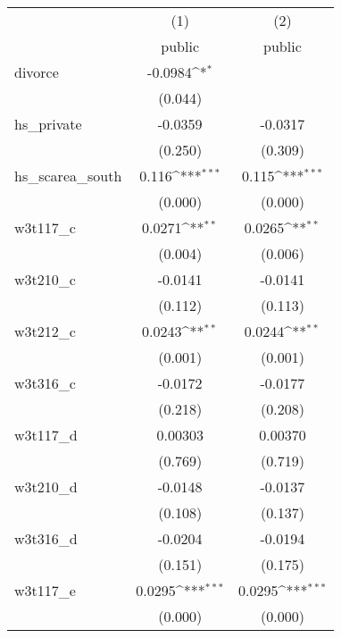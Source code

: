 {
\def\sym#1{\ifmmode^{#1}\else\(^{#1}\)\fi}
\begin{tabular}{l*{2}{c}}
\hline\hline
            &\multicolumn{1}{c}{(1)}&\multicolumn{1}{c}{(2)}\\
            &\multicolumn{1}{c}{public}&\multicolumn{1}{c}{public}\\
\hline
divorce     &     -0.0984\sym{*}  &                     \\
            &     (0.044)         &                     \\
[1em]
hs\_private  &     -0.0359         &     -0.0317         \\
            &     (0.250)         &     (0.309)         \\
[1em]
hs\_scarea\_south&       0.116\sym{***}&       0.115\sym{***}\\
            &     (0.000)         &     (0.000)         \\
[1em]
w3t117\_c    &      0.0271\sym{**} &      0.0265\sym{**} \\
            &     (0.004)         &     (0.006)         \\
[1em]
w3t210\_c    &     -0.0141         &     -0.0141         \\
            &     (0.112)         &     (0.113)         \\
[1em]
w3t212\_c    &      0.0243\sym{**} &      0.0244\sym{**} \\
            &     (0.001)         &     (0.001)         \\
[1em]
w3t316\_c    &     -0.0172         &     -0.0177         \\
            &     (0.218)         &     (0.208)         \\
[1em]
w3t117\_d    &     0.00303         &     0.00370         \\
            &     (0.769)         &     (0.719)         \\
[1em]
w3t210\_d    &     -0.0148         &     -0.0137         \\
            &     (0.108)         &     (0.137)         \\
[1em]
w3t316\_d    &     -0.0204         &     -0.0194         \\
            &     (0.151)         &     (0.175)         \\
[1em]
w3t117\_e    &      0.0295\sym{***}&      0.0295\sym{***}\\
            &     (0.000)         &     (0.000)         \\
[1em]

\end{tabular}}
